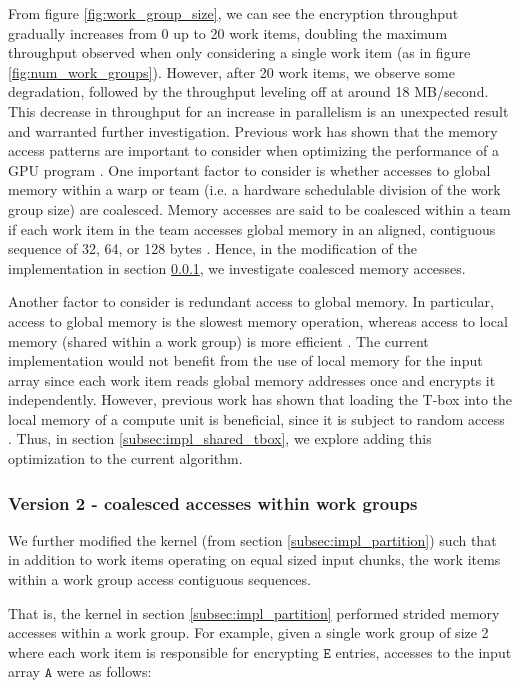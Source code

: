 \documentclass[conference,10pt]{IEEEtran}
\begin{document}
From figure \ref{fig:work_group_size}, we can see the encryption throughput gradually increases from 0 up 
to 20 work items, doubling the maximum throughput observed when only considering a single work item (as in 
figure \ref{fig:num_work_groups}).  However, after 20 work items, we observe some degradation, followed by 
the throughput leveling off at around 18 MB/second.  This decrease in throughput for an increase in 
parallelism is an unexpected result and warranted further investigation.  Previous work has shown that the 
memory access patterns are important to consider when optimizing the performance of a GPU program 
\cite{gpu_mem}.  One important factor to consider is whether accesses to global memory within a warp 
\cite{gpu_mem} or team \cite{opencl_guide} (i.e. a hardware schedulable division of the work group size) 
are coalesced.  Memory accesses are said to be coalesced within a team if each work item in the team 
accesses global memory in an aligned, contiguous sequence of 32, 64, or 128 bytes \cite{nvidia_opencl}.  
Hence, in the modification of the implementation in section \ref{subsec:impl_coalesce}, we investigate 
coalesced memory accesses.  

Another factor to consider is redundant access to global memory.  In particular, access to global memory is 
the slowest memory operation, whereas access to local memory (shared within a work group) is more efficient 
\cite{opencl_guide}.  The current implementation would not benefit from the use of local memory for the 
input array since each work item reads global memory addresses once and encrypts it independently.  
However, previous work has shown that loading the T-box into the local memory of a compute unit is 
beneficial, since it is subject to random access \cite{shared_tbox}.  Thus, in section 
\ref{subsec:impl_shared_tbox}, we explore adding this optimization to the current algorithm.

\subsubsection{Version 2 - coalesced accesses within work groups}
\label{subsec:impl_coalesce}

We further modified the kernel (from section \ref{subsec:impl_partition}) such that in addition to work 
items operating on equal sized input chunks, the work items within a work group access contiguous 
sequences.  

That is, the kernel in section \ref{subsec:impl_partition} performed strided memory accesses \cite{gpu_mem} 
within a work group.  For example, given a single work group of size 2 where each work item is responsible 
for encrypting $\mathtt{E}$ entries, accesses to the input array $\mathtt{A}$ were as follows:
\end{document}
